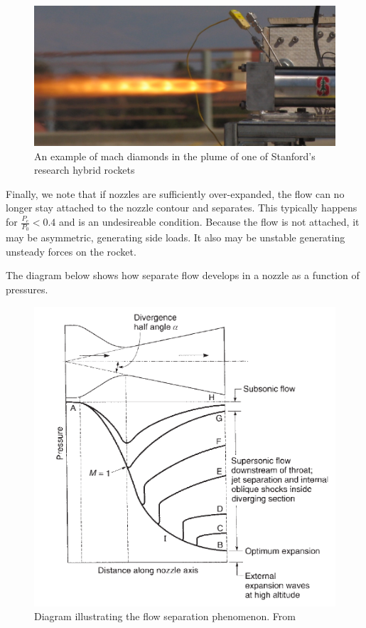 \documentclass[twocolumn]{memoir} %
\begin{document}
\begin{figure}[h]
    \includegraphics[width=0.9\columnwidth]{mach_diamonds}
    \caption{An example of mach diamonds in the plume of one of Stanford's research
    hybrid rockets}
\end{figure}

Finally, we note that if nozzles are sufficiently over-expanded, the flow can no longer
stay attached to the nozzle contour and separates.  This typically happens for 
$\frac{P_e}{P_0} < 0.4$ and is an undesireable condition.  Because the flow is not attached,
it may be asymmetric, generating side loads.  It also may be unstable generating unsteady
forces on the rocket.

The diagram below shows how separate flow develops in a nozzle as a function of pressures.

\begin{figure}[H]
    \includegraphics[width=0.9\columnwidth]{separation_sutton}
    \caption{Diagram illustrating the flow separation phenomenon.  From \cite{sutton}}
\end{figure}
\end{document}
